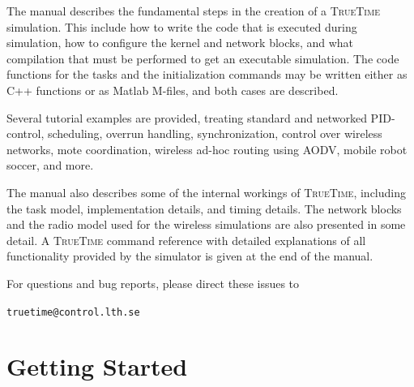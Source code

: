\documentclass[final,twoside]{rapport}
\begin{document}
The manual describes the fundamental steps in the creation of a
\textsc{TrueTime} simulation. This include how to write the code that
is executed during simulation, how to configure the kernel and network
blocks, and what compilation that must be performed to get an
executable simulation. The code functions for the tasks and the
initialization commands may be written either as C++ functions or as
Matlab M-files, and both cases are described.

Several tutorial examples are provided, treating standard and
networked PID-control, scheduling, overrun handling,
synchronization, control over wireless networks, mote coordination,
wireless ad-hoc routing using AODV, mobile robot soccer, and more.

The manual also describes some of the internal workings of
\textsc{TrueTime}, including the task model, implementation details,
and timing details. The network blocks and the radio model used for
the wireless simulations are also presented in some detail. A
\textsc{TrueTime} command reference with detailed explanations of all
functionality provided by the simulator is given at the end of the
manual.

For questions and bug reports, please direct these issues to 
\medskip

\centerline{{\tt truetime@control.lth.se}}

%

\section{Getting Started}
\label{sec:start}
\end{document}
